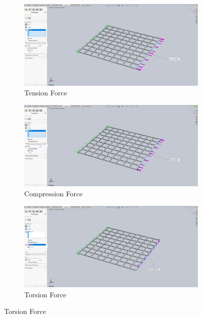 \documentclass[12pt, letterpaper]{article}
\begin{document}
\begin{figure}[H]
	\centering
	\caption{Applied Loads}
	\label{fig:sim-loads}
	\begin{subfigure}[t]{.8\linewidth}
		\includegraphics[width=\linewidth]{./procedure/tension-force}
		\caption{Tension Force}
	\end{subfigure}
	\begin{subfigure}[t]{.8\linewidth}
		\includegraphics[width=\linewidth]{./procedure/compression-force}
		\caption{Compression Force}
	\end{subfigure}
	\begin{subfigure}[t]{.8\linewidth}
		\includegraphics[width=\linewidth]{./procedure/torsion-force}
		\caption{Torsion Force}
	\end{subfigure}
\end{figure}
\end{document}
